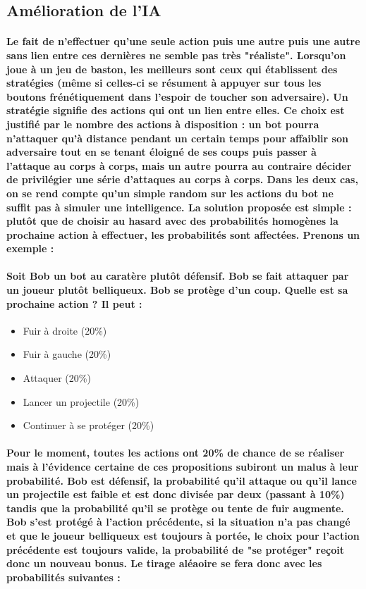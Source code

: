\subsection{Amélioration de l'IA}

\paragraph{Le fait de n'effectuer qu'une seule action puis une autre puis une autre sans lien entre ces dernières ne semble pas très "réaliste". Lorsqu'on joue à un jeu de baston, les meilleurs sont ceux qui établissent des stratégies (même si celles-ci se résument à appuyer sur tous les boutons frénétiquement dans l'espoir de toucher son adversaire). Un stratégie signifie des actions qui ont un lien entre elles. Ce choix est justifié par le nombre des actions à disposition : un bot pourra n'attaquer qu'à distance pendant un certain temps pour affaiblir son adversaire tout en se tenant éloigné de ses coups puis passer à l'attaque au corps à corps, mais un autre pourra au contraire décider de privilégier une série d'attaques au corps à corps. Dans les deux cas, on se rend compte qu'un simple random sur les actions du bot ne suffit pas à simuler une intelligence. La solution proposée est simple : \textbf{plutôt que de choisir au hasard avec des probabilités homogènes la prochaine action à effectuer, les probabilités sont affectées}. Prenons un exemple : }

\paragraph{Soit Bob un bot au caratère plutôt défensif. Bob se fait attaquer par un joueur plutôt belliqueux.
Bob se protège d'un coup. Quelle est sa prochaine action ? Il peut : }
\begin{itemize}
	\item Fuir à droite (20\%)
	\item Fuir à gauche (20\%)
	\item Attaquer (20\%)
	\item Lancer un projectile (20\%)
	\item Continuer à se protéger (20\%)
\end{itemize}

\paragraph{Pour le moment, toutes les actions ont 20\% de chance de se réaliser mais à l'évidence certaine de ces propositions subiront un malus à leur probabilité. Bob est défensif, la probabilité qu'il attaque ou qu'il lance un projectile est faible et est donc divisée par deux (passant à 10\%) tandis que la probabilité qu'il se protège ou tente de fuir augmente. Bob s'est protégé à l'action précédente, si la situation n'a pas changé et que le joueur belliqueux est toujours à portée, le choix pour l'action précédente est toujours valide, la probabilité de "se protéger" reçoit donc un nouveau bonus. Le tirage aléaoire se fera donc avec les probabilités suivantes :}

